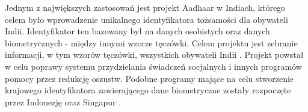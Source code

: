 Jednym z największych zastosowań jest projekt Aadhaar w Indiach, którego celem było wprowadzenie
unikalnego identyfikatora tożsamości dla obywateli Indii. Identyfikator ten bazowany był na danych
osobistych oraz danych biometrycznych - między innymi wzorze tęczówki. Celem projektu jest zebranie
informacji, w tym wzorów tęczówki, wszystkich obywateli Indii \cite{DaugmanIndia}. Projekt powstał w
celu poprawy systemu przydzielania świadczeń socjalnych i innych programów pomocy przez redukcję oszustw.
Podobne programy mające na celu stworzenie krajowego identyfikatora zawierającego dane biometryczne
zostały rozpoczęte przez Indonezję oraz Singapur \cite{DaugmanApplications}.

